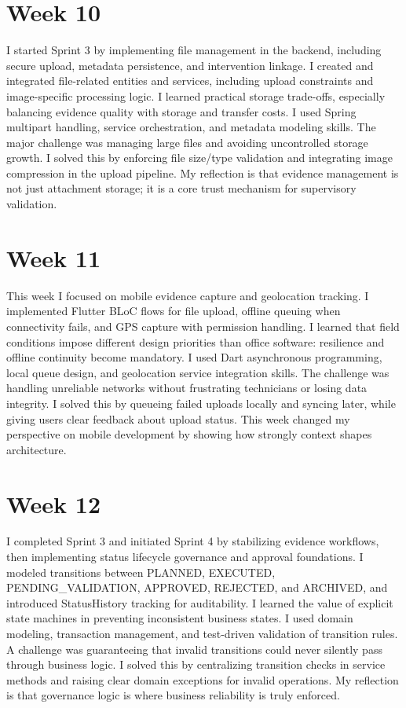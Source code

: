 \section*{Week 10}
I started Sprint 3 by implementing file management in the backend, including secure upload, metadata persistence, and intervention linkage. I created and integrated file-related entities and services, including upload constraints and image-specific processing logic. I learned practical storage trade-offs, especially balancing evidence quality with storage and transfer costs. I used Spring multipart handling, service orchestration, and metadata modeling skills. The major challenge was managing large files and avoiding uncontrolled storage growth. I solved this by enforcing file size/type validation and integrating image compression in the upload pipeline. My reflection is that evidence management is not just attachment storage; it is a core trust mechanism for supervisory validation.

\section*{Week 11}
This week I focused on mobile evidence capture and geolocation tracking. I implemented Flutter BLoC flows for file upload, offline queuing when connectivity fails, and GPS capture with permission handling. I learned that field conditions impose different design priorities than office software: resilience and offline continuity become mandatory. I used Dart asynchronous programming, local queue design, and geolocation service integration skills. The challenge was handling unreliable networks without frustrating technicians or losing data integrity. I solved this by queueing failed uploads locally and syncing later, while giving users clear feedback about upload status. This week changed my perspective on mobile development by showing how strongly context shapes architecture.

\section*{Week 12}
I completed Sprint 3 and initiated Sprint 4 by stabilizing evidence workflows, then implementing status lifecycle governance and approval foundations. I modeled transitions between PLANNED, EXECUTED, PENDING_VALIDATION, APPROVED, REJECTED, and ARCHIVED, and introduced StatusHistory tracking for auditability. I learned the value of explicit state machines in preventing inconsistent business states. I used domain modeling, transaction management, and test-driven validation of transition rules. A challenge was guaranteeing that invalid transitions could never silently pass through business logic. I solved this by centralizing transition checks in service methods and raising clear domain exceptions for invalid operations. My reflection is that governance logic is where business reliability is truly enforced.

